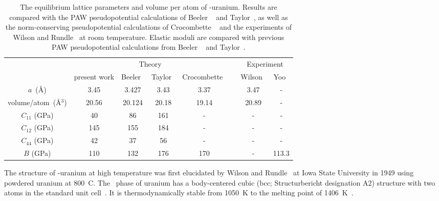 \begin{table}
\caption[Comparison of ground-state properties and elastic moduli of \textgamma-U with previous work]{The equilibrium lattice parameters and volume per atom of \textgamma-uranium. Results are compared with the PAW pseudopotential calculations of Beeler \etal~\cite{beeler2013first} and Taylor~\cite{taylor2008evaluation}, as well as the norm-conserving pseudopotential calculations of Crocombette \etal~\cite{crocombette2001plane} and the experiments of Wilson and Rundle~\cite{wilson1949structures} at room temperature. Elastic moduli are compared with previous PAW pseudopotential calculations from Beeler \etal~\cite{beeler2013first} and Taylor~\cite{taylor2008evaluation}.}
\label{table_eq_gamma}
\footnotesize
\begin{tabular}{cccccccc}
  \hline
  & \multicolumn{4}{c}{Theory} && \multicolumn{2}{c}{Experiment} \\
  \cline{2-5}\cline{7-8}
			& present work & Beeler~\cite{beeler2013first} & Taylor~\cite{taylor2008evaluation} & Crocombette~\cite{crocombette2001plane} && Wilson~\cite{wilson1949structures} & Yoo~\cite{yoo1998phase} \\ \hline
$a$~(\AA)			&   3.45	   & 3.427	& 3.43	 & 3.37		   && 3.47	&-			\\		
volume/atom~(\AA$^3$) & 20.56		   & 20.124	& 20.18	 & 19.14	   && 20.89	&-			\\ 
$C_{11}$ (GPa) &	40		   & 86		& 161	 & -	&&-	&-	\\ 
$C_{12}$ (GPa) &	145		   & 155	& 184	 & -	&&-	&-	\\
$C_{44}$ (GPa) &   42		   & 37		& 56	 & -	&&-	&-	\\ 
$B$ (GPa)		&  110		   & 132	& 176	 & 170	&&-	& 113.3	\\ \hline
\end{tabular}
\end{table}

The structure of \textgamma-uranium at high temperature was first
elucidated by Wilson and Rundle~\cite{wilson1949structures} at Iowa
State University in 1949 using powdered uranium at
800~\textdegree C\@. The \textgamma~phase of uranium has a
body-centered cubic (bcc; Structurbericht designation A2) structure
with two atoms in the standard unit
cell~\cite{yakel1973review,nashchemistry}.
It is thermodynamically stable from 1050~K to the melting point of
1406~K~\cite{yoo1998phase}.

